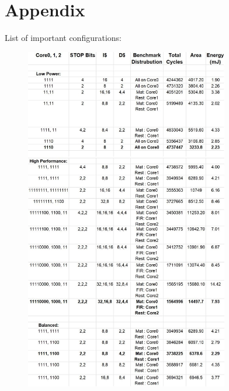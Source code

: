 \documentclass[conference]{IEEEtran}
\begin{document}
\section{Appendix}
List of important configurations:\\
\begin{figure}[h!]
\centering
\includegraphics[width=3.5in]{Appendix.jpg}
\end{figure}

\end{document}
